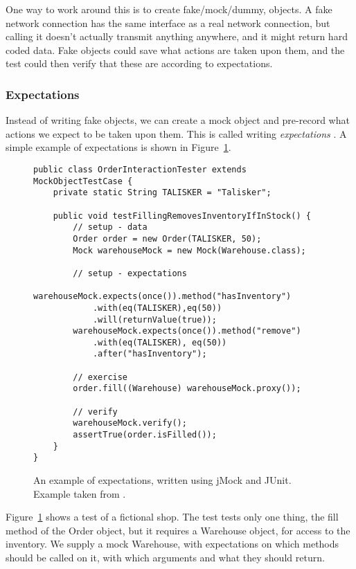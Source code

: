 \documentclass[a4paper,11pt]{kth-mag}
\begin{document}
One way to work around this is to create fake/mock/dummy, objects. A fake
network connection has the same interface as a real network connection, but
calling it doesn't actually transmit anything anywhere, and it might return
hard coded data. Fake objects could save what actions are taken upon them, and
the test could then verify that these are according to expectations.

\subsubsection{Expectations}

Instead of writing fake objects, we can create a mock object and pre-record
what actions we expect to be taken upon them. This is called writing
\textit{expectations} \cite{fowler07expectations}. A simple example of
expectations is shown in Figure~\ref{figure-expectations}.

\begin{figure}[h!]

\lstset{language=Java}
\begin{lstlisting}
public class OrderInteractionTester extends MockObjectTestCase {
	private static String TALISKER = "Talisker";

	public void testFillingRemovesInventoryIfInStock() {
		// setup - data
		Order order = new Order(TALISKER, 50);
		Mock warehouseMock = new Mock(Warehouse.class);

		// setup - expectations
		warehouseMock.expects(once()).method("hasInventory")
			.with(eq(TALISKER),eq(50))
			.will(returnValue(true));
		warehouseMock.expects(once()).method("remove")
			.with(eq(TALISKER), eq(50))
			.after("hasInventory");

		// exercise
		order.fill((Warehouse) warehouseMock.proxy());

		// verify
		warehouseMock.verify();
		assertTrue(order.isFilled());
	}
}
\end{lstlisting}

\caption{An example of expectations, written using jMock and JUnit.
Example taken from \cite{fowler07expectations}.}
\label{figure-expectations}
\end{figure}

Figure~\ref{figure-expectations} shows a test of a fictional shop. The test
tests only one thing, the fill method of the Order object, but it requires a
Warehouse object, for access to the inventory. We supply a mock Warehouse, with
expectations on which methods should be called on it, with which arguments and
what they should return.
\end{document}
